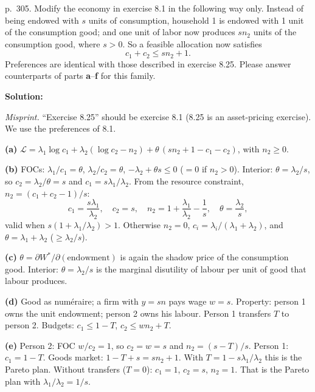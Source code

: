 \documentclass[12pt, letterpaper]{article}
\begin{document}
\begin{tcolorbox}[evenbox,title={Exercise 8.2 \quad Family economics, II}]
\begin{tcolorbox}[questionbox]
p.~305. Modify the economy in exercise 8.1 in the following way only. Instead of being endowed with $s$
units of consumption, household 1 is endowed with 1 unit of the consumption good; and one unit of labor
now produces $sn_2$ units of the consumption good, where $s>0$. So a feasible allocation now satisfies
\[
c_1+c_2\le sn_2+1.
\]
Preferences are identical with those described in exercise 8.25. Please answer counterparts of parts
\textbf{a}--\textbf{f} for this family.
\end{tcolorbox}

\textbf{Solution:}

\emph{Misprint.} ``Exercise 8.25'' should be exercise 8.1 (8.25 is an asset-pricing exercise). We use the
preferences of 8.1.

\textbf{(a)} $\mathcal L=\lambda_1\log c_1+\lambda_2(\log c_2-n_2)+\theta\,(sn_2+1-c_1-c_2)$, with $n_2\ge0$.

\textbf{(b)} FOCs: $\lambda_1/c_1=\theta$, $\lambda_2/c_2=\theta$, $-\lambda_2+\theta s\le0$ ($=0$ if $n_2>0$).
Interior: $\theta=\lambda_2/s$, so $c_2=\lambda_2/\theta=s$ and $c_1=s\lambda_1/\lambda_2$. From the resource
constraint, $n_2=(c_1+c_2-1)/s$:
\[
\boxed{c_1=\frac{s\lambda_1}{\lambda_2},\quad c_2=s,\quad n_2=1+\frac{\lambda_1}{\lambda_2}-\frac1s,\quad\theta=\frac{\lambda_2}{s},}
\]
valid when $s(1+\lambda_1/\lambda_2)>1$. Otherwise $n_2=0$, $c_i=\lambda_i/(\lambda_1+\lambda_2)$, and
$\theta=\lambda_1+\lambda_2$ ($\ge\lambda_2/s$). \checkmark

\textbf{(c)} $\theta=\partial W^\ast/\partial(\text{endowment})$ is again the shadow price of the consumption good.
Interior: $\theta=\lambda_2/s$ is the marginal disutility of labour per unit of good that labour produces.

\textbf{(d)} Good as num\'eraire; a firm with $y=sn$ pays wage $w=s$. Property: person 1 owns the unit
endowment; person 2 owns his labour. Person 1 transfers $T$ to person 2. Budgets: $c_1\le1-T$,
$c_2\le wn_2+T$.

\textbf{(e)} Person 2: FOC $w/c_2=1$, so $c_2=w=s$ and $n_2=(s-T)/s$. Person 1: $c_1=1-T$. Goods market:
$1-T+s=sn_2+1$. \checkmark{} With $T=1-s\lambda_1/\lambda_2$ this is the Pareto plan. Without transfers
($T=0$): $c_1=1$, $c_2=s$, $n_2=1$. That is the Pareto plan with $\lambda_1/\lambda_2=1/s$.


\end{tcolorbox}
\end{document}
